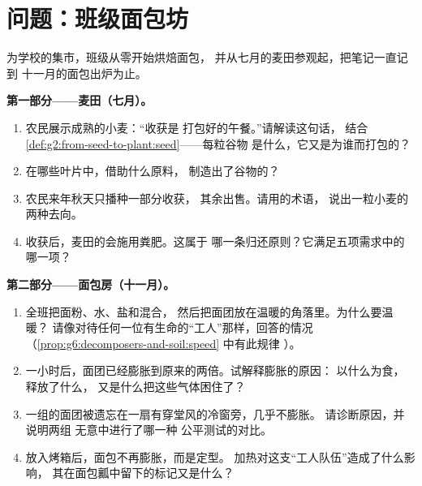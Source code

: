 \section{问题：班级面包坊}

\begin{problem}\label{pb:g6:producing-our-food:1}
为学校的集市，班级从零开始烘焙面包，
并从七月的麦田参观起，把笔记一直记到
十一月的面包出炉为止。

\medskip\noindent\textbf{第一部分——麦田（七月）。}
\begin{enumerate}
  \item 农民展示成熟的小麦：“收获是
        打包好的午餐。”请解读这句话，
        结合\cref{def:g2:from-seed-to-plant:seed}——每粒谷物
        是什么，它又是为谁而打包的？
  \item 在哪些叶片中，借助什么原料，
        制造出了谷物的？
  \item 农民来年秋天只播种一部分收获，
        其余出售。请用的术语，
        说出一粒小麦的两种去向。
  \item 收获后，麦田的会施用粪肥。这属于
        哪一条归还原则？它满足五项需求中的
        哪一项？
\end{enumerate}

\medskip\noindent\textbf{第二部分——面包房（十一月）。}
\begin{enumerate}[resume]
  \item 全班把面粉、水、盐和混合，
        然后把面团放在温暖的角落里。为什么要温暖？
        请像对待任何一位有生命的“工人”那样，回答的情况
        （\cref{prop:g6:decomposers-and-soil:speed} 中有此规律
        ）。
  \item 一小时后，面团已经膨胀到原来的两倍。试解释膨胀的原因：
        以什么为食，释放了什么，
        又是什么把这些气体困住了？
  \item 一组的面团被遗忘在一扇有穿堂风的冷窗旁，几乎不膨胀。
        请诊断原因，并说明两组
        无意中进行了哪一种
        公平测试的对比。
  \item 放入烤箱后，面包不再膨胀，而是定型。
        加热对这支“工人队伍”造成了什么影响，
        其在面包瓤中留下的标记又是什么？
\end{enumerate}


\end{problem}
